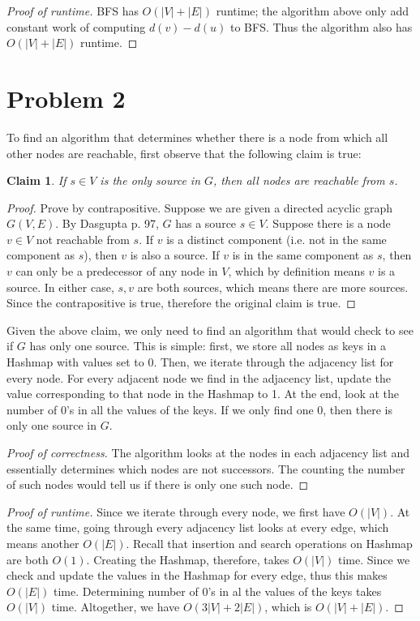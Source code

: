 \documentclass{article}
\newtheorem{claim}{Claim}
\begin{document}
\begin{proof}[Proof of runtime]
BFS has $O(|V|+|E|)$ runtime; the algorithm above only add constant work of computing $d(v)-d(u)$ to BFS. Thus the algorithm also has $O(|V|+|E|)$ runtime.
\end{proof}
\pagebreak

\section*{Problem 2}
To find an algorithm that determines whether there is a node from which all other nodes are reachable, first observe that the following claim is true:
\begin{claim}
If $s\in V$ is the only source in $G$, then all nodes are reachable from $s$.
\end{claim}
\begin{proof}
Prove by contrapositive. Suppose we are given a directed acyclic graph $G(V,E)$. By Dasgupta p. 97, $G$ has a source $s \in V$. Suppose there is a node $v\in V$ not reachable from $s$. If $v$ is a distinct component (i.e. not in the same component as $s$), then $v$ is also a source. If $v$ is in the same component as $s$, then $v$ can only be a predecessor of any node in $V$, which by definition means $v$ is a source. In either case, $s,v$ are both sources, which means there are more sources. Since the contrapositive is true, therefore the original claim is true.
\end{proof}
Given the above claim, we only need to find an algorithm that would check to see if $G$ has only one source. This is simple: first, we store all nodes as keys in a Hashmap with values set to 0. Then, we iterate through the adjacency list for every node. For every adjacent node we find in the adjacency list, update the value corresponding to that node in the Hashmap to 1. At the end, look at the number of 0's in all the values of the keys. If we only find one 0, then there is only one source in $G$.
\begin{proof}[Proof of correctness]
The algorithm looks at the nodes in each adjacency list and essentially determines which nodes are not successors. The counting the number of such nodes would tell us if there is only one such node.
\end{proof}
\begin{proof}[Proof of runtime]
Since we iterate through every node, we first have $O(|V|)$. At the same time, going through every adjacency list looks at every edge, which means another $O(|E|)$. Recall that insertion and search operations on Hashmap are both $O(1)$. Creating the Hashmap, therefore, takes $O(|V|)$ time. Since we check and update the values in the Hashmap for every edge, thus this makes $O(|E|)$ time. Determining number of 0's in al the values of the keys takes $O(|V|)$ time. Altogether, we have $O(3|V| + 2|E|)$, which is $O(|V|+|E|)$.
\end{proof}
\pagebreak
\end{document}
